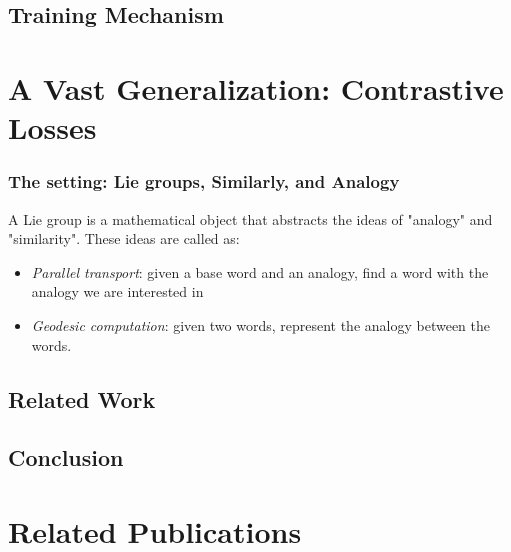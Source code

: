 \documentclass[11pt]{book}
\begin{document}
\section{Training Mechanism}

\chapter{A Vast Generalization: Contrastive Losses}

\subsection{The setting: Lie groups, Similarly, and Analogy}
A Lie group is a mathematical object that abstracts the ideas of "analogy"
and "similarity". These ideas are called as:
\begin{itemize}
\item \emph{Parallel transport}: given a base word and an analogy, find a word with the analogy we are interested in
\item \emph{Geodesic computation}: given two words, represent the analogy between the words.
\end{itemize}

\section{Related Work}

\section{Conclusion}



\chapter*{Related Publications}
\label{ch:relatedPubs}




 
\end{document}
